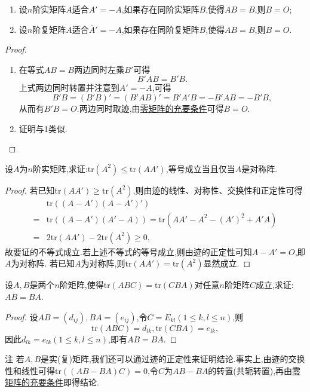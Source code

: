 \documentclass[lang=cn,newtx,10pt,scheme=chinese]{elegantbook}
\begin{document}
\begin{proposition}\label{proposition:反称/反酉矩阵为零矩阵的充要条件}
\begin{enumerate}
    \item 设\(n\)阶实矩阵\(A\)适合\(A'=-A\),如果存在同阶实矩阵\(B\),使得\(AB = B\),则\(B = O\);
    \item 设\(n\)阶复矩阵\(A\)适合\(\overline{A}'=-A\),如果存在同阶复矩阵\(B\),使得\(AB = B\),则\(B = O\).
\end{enumerate}
\end{proposition}
\begin{proof}
\begin{enumerate}
\item 在等式\(AB = B\)两边同时左乘\(B'\)可得
\[
B'AB = B'B.
\]
上式两边同时转置并注意到\(A'=-A\),可得
\[
B'B=(B'B)'=(B'AB)'=B'A'B=-B'AB=-B'B,
\]
从而有\(B'B = O\).两边同时取迹,由\hyperref[proposition:零矩阵的充要条件]{零矩阵的充要条件}可得\(B = O\).
\item 证明与1类似.
\end{enumerate}
\end{proof}

\begin{proposition}\label{proposition:矩阵迹的不等式}
    设\(A\)为\(n\)阶实矩阵,求证:\(\mathrm{tr}(A^2)\leq\mathrm{tr}(AA')\),等号成立当且仅当\(A\)是对称阵.
\end{proposition}
\begin{proof}
若已知$\mathrm{tr}(AA') \geq \mathrm{tr}(A^2)$,则由迹的线性、对称性、交换性和正定性可得
\begin{align*}
&\mathrm{tr}((A - A')(A - A')')\\
=&\mathrm{tr}((A - A')(A' - A))=\mathrm{tr}(AA' - A^2 - (A')^2 + A'A)\\
=&2\mathrm{tr}(AA') - 2\mathrm{tr}(A^2)\geq0,
\end{align*}
故要证的不等式成立.若上述不等式的等号成立,则由迹的正定性可知\(A - A' = O\),即\(A\)为对称阵.
若已知$A$为对称阵,则$\mathrm{tr}(AA') = \mathrm{tr}(A^2)$显然成立.
\end{proof}

\begin{proposition}\label{proposition:矩阵可交换关于迹的充分条件}
设\(A,B\)是两个\(n\)阶矩阵,使得\(\mathrm{tr}(ABC)=\mathrm{tr}(CBA)\)对任意\(n\)阶矩阵\(C\)成立,求证:\(AB = BA\).
\end{proposition}
\begin{proof}
设\(AB=(d_{ij}),BA=(e_{ij})\),令\(C = E_{kl}(1\leq k,l\leq n)\),则
\[
\mathrm{tr}(ABC)=d_{lk},\mathrm{tr}(CBA)=e_{lk},
\]
因此\(d_{lk}=e_{lk}(1\leq k,l\leq n)\),即有\(AB = BA\).
\end{proof}
\begin{remark}
    注 若\(A,B\)是实(复)矩阵,我们还可以通过迹的正定性来证明结论.事实上,由迹的交换性和线性可得\(\mathrm{tr}((AB - BA)C)=0\),令\(C\)为\(AB - BA\)的转置(共轭转置),再由\hyperref[proposition:零矩阵的充要条件]{零矩阵的充要条件}即得结论.
\end{remark}
\end{document}
